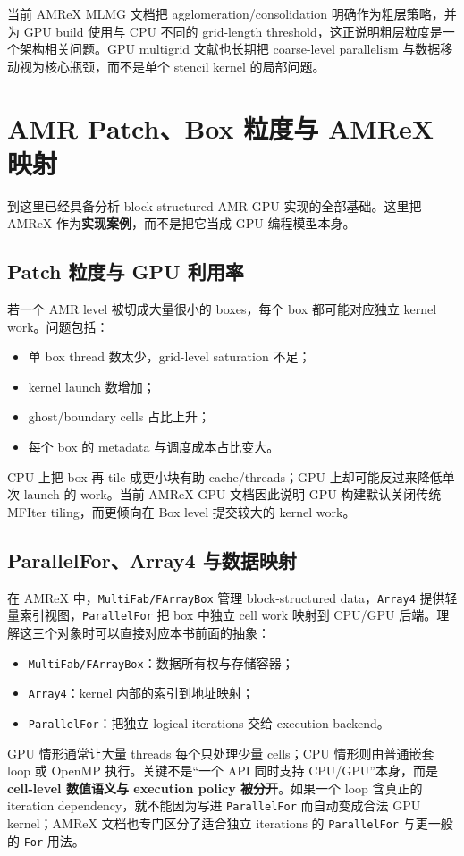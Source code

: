 当前 AMReX MLMG 文档把 agglomeration/consolidation 明确作为粗层策略，并为 GPU build 使用与 CPU 不同的 grid-length threshold，这正说明粗层粒度是一个架构相关问题\cite{amrexMLMGdocs2026}。GPU multigrid 文献也长期把 coarse-level parallelism 与数据移动视为核心瓶颈，而不是单个 stencil kernel 的局部问题\cite{naumov2015amgx,antepara2024brick,stokesgpu2025}。

\section{AMR Patch、Box 粒度与 AMReX 映射}
\label{sec:gpu-amrex-case}

到这里已经具备分析 block-structured AMR GPU 实现的全部基础。这里把 AMReX 作为\textbf{实现案例}，而不是把它当成 GPU 编程模型本身。

\subsection{Patch 粒度与 GPU 利用率}

若一个 AMR level 被切成大量很小的 boxes，每个 box 都可能对应独立 kernel work。问题包括：
\begin{itemize}
\item 单 box thread 数太少，grid-level saturation 不足；
\item kernel launch 数增加；
\item ghost/boundary cells 占比上升；
\item 每个 box 的 metadata 与调度成本占比变大。
\end{itemize}

CPU 上把 box 再 tile 成更小块有助 cache/threads；GPU 上却可能反过来降低单次 launch 的 work。当前 AMReX GPU 文档因此说明 GPU 构建默认关闭传统 MFIter tiling，而更倾向在 Box level 提交较大的 kernel work\cite{amrexGPUdocs2026}。

\subsection{ParallelFor、Array4 与数据映射}

在 AMReX 中，\texttt{MultiFab/FArrayBox} 管理 block-structured data，\texttt{Array4} 提供轻量索引视图，\texttt{ParallelFor} 把 box 中独立 cell work 映射到 CPU/GPU 后端\cite{amrexGPUdocs2026}。理解这三个对象时可以直接对应本书前面的抽象：
\begin{itemize}
\item \texttt{MultiFab/FArrayBox}：数据所有权与存储容器；
\item \texttt{Array4}：kernel 内部的索引到地址映射；
\item \texttt{ParallelFor}：把独立 logical iterations 交给 execution backend。
\end{itemize}
GPU 情形通常让大量 threads 每个只处理少量 cells；CPU 情形则由普通嵌套 loop 或 OpenMP 执行。关键不是“一个 API 同时支持 CPU/GPU”本身，而是\textbf{cell-level 数值语义与 execution policy 被分开}。如果一个 loop 含真正的 iteration dependency，就不能因为写进 \texttt{ParallelFor} 而自动变成合法 GPU kernel；AMReX 文档也专门区分了适合独立 iterations 的 \texttt{ParallelFor} 与更一般的 \texttt{For} 用法\cite{amrexGPUdocs2026}。

